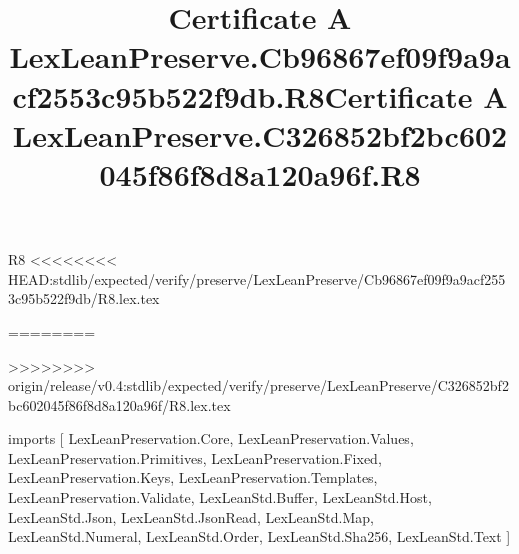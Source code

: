 \begin{lexlean}{R8}
<<<<<<<< HEAD:stdlib/expected/verify/preserve/LexLeanPreserve/Cb96867ef09f9a9acf2553c95b522f9db/R8.lex.tex
\title{Certificate A LexLeanPreserve.Cb96867ef09f9a9acf2553c95b522f9db.R8}
========
\title{Certificate A LexLeanPreserve.C326852bf2bc602045f86f8d8a120a96f.R8}
>>>>>>>> origin/release/v0.4:stdlib/expected/verify/preserve/LexLeanPreserve/C326852bf2bc602045f86f8d8a120a96f/R8.lex.tex
\begin{coremodule}
imports [
  LexLeanPreservation.Core,
  LexLeanPreservation.Values,
  LexLeanPreservation.Primitives,
  LexLeanPreservation.Fixed,
  LexLeanPreservation.Keys,
  LexLeanPreservation.Templates,
  LexLeanPreservation.Validate,
  LexLeanStd.Buffer,
  LexLeanStd.Host,
  LexLeanStd.Json,
  LexLeanStd.JsonRead,
  LexLeanStd.Map,
  LexLeanStd.Numeral,
  LexLeanStd.Order,
  LexLeanStd.Sha256,
  LexLeanStd.Text
]


\end{coremodule}
\end{lexlean}
